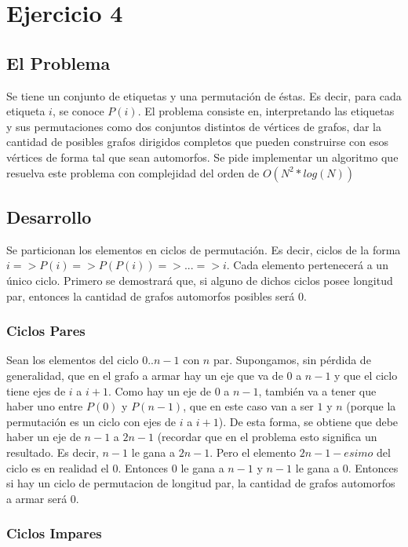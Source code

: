 \section{Ejercicio 4}
\subsection{El Problema}

Se tiene un conjunto de etiquetas y una permutación de éstas. Es decir, para cada etiqueta $i$, se conoce $P(i)$. El problema consiste en, interpretando las etiquetas y sus permutaciones como dos conjuntos distintos de vértices de grafos, dar la cantidad de posibles grafos dirigidos completos que pueden construirse con esos vértices de forma tal que sean automorfos. Se pide implementar un algoritmo que resuelva este problema con complejidad del orden de $O(N^2*log(N))$

\subsection{Desarrollo}

Se particionan los elementos en ciclos de permutación. Es decir, ciclos de la forma $i => P(i) => P(P(i)) => ... => i$. Cada elemento pertenecerá a un único ciclo. Primero se demostrará que, si alguno de dichos ciclos posee longitud par, entonces la cantidad de grafos automorfos posibles será 0.

\subsubsection{Ciclos Pares}

Sean los elementos del ciclo $0..n-1$ con $n$ par. Supongamos, sin pérdida de generalidad, que en el grafo a armar hay un eje que va de $0$ a $n-1$ y que el ciclo tiene ejes de $i$ a $i+1$. Como hay un eje de $0$ a $n-1$, también va a tener que haber uno entre $P(0)$ y $P(n-1)$, que en este caso van a ser $1$ y $n$ (porque la permutación es un ciclo con ejes de $i$ a $i+1$). De esta forma, se obtiene que debe haber un eje de $n-1$ a $2n-1$ (recordar que en el problema esto significa un resultado. Es decir, $n-1$ le gana a $2n-1$. Pero el elemento $2n-1-esimo$ del ciclo es en realidad el $0$. Entonces $0$ le gana a $n-1$ y $n-1$ le gana a $0$. Entonces si hay un ciclo de permutacion de longitud par, la cantidad de grafos automorfos a armar será 0.

\subsubsection{Ciclos Impares}

